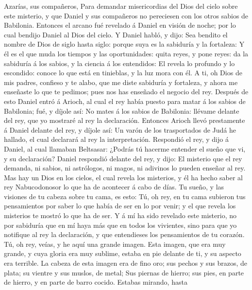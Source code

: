 Azarías, sus compañeros,  Para demandar misericordias del
Dios del cielo sobre este misterio, y que Daniel y sus compañeros no
pereciesen con los otros sabios de Babilonia.  Entonces el
arcano fué revelado á Daniel en visión de noche; por lo cual bendijo
Daniel al Dios del cielo.  Y Daniel habló, y dijo: Sea
bendito el nombre de Dios de siglo hasta siglo: porque suya es la
sabiduría y la fortaleza:  Y él es el que muda los tiempos
y las oportunidades: quita reyes, y pone reyes: da la sabiduría á los
sabios, y la ciencia á los entendidos:  El revela lo
profundo y lo escondido: conoce lo que está en tinieblas, y la luz mora
con él.  A ti, oh Dios de mis padres, confieso y te alabo,
que me diste sabiduría y fortaleza, y ahora me enseñaste lo que te
pedimos; pues nos has enseñado el negocio del rey.  Después
de esto Daniel entró á Arioch, al cual el rey había puesto para matar á
los sabios de Babilonia; fué, y díjole así: No mates á los sabios de
Babilonia: llévame delante del rey, que yo mostraré al rey la
declaración.  Entonces Arioch llevó prestamente á Daniel
delante del rey, y díjole así: Un varón de los trasportados de Judá he
hallado, el cual declarará al rey la interpretación. 
Respondió el rey, y dijo á Daniel, al cual llamaban Beltsasar: ¿Podrás
tú hacerme entender el sueño que vi, y su declaración? 
Daniel respondió delante del rey, y dijo: El misterio que el rey
demanda, ni sabios, ni astrólogos, ni magos, ni adivinos lo pueden
enseñar al rey.  Mas hay un Dios en los cielos, el cual
revela los misterios, y él ha hecho saber al rey Nabucodonosor lo que ha
de acontecer á cabo de días. Tu sueño, y las visiones de tu cabeza sobre
tu cama, es esto:  Tú, oh rey, en tu cama subieron tus
pensamientos por saber lo que había de ser en lo por venir; y el que
revela los misterios te mostró lo que ha de ser.  Y á mí ha
sido revelado este misterio, no por sabiduría que en mí haya más que en
todos los vivientes, sino para que yo notifique al rey la declaración, y
que entendieses los pensamientos de tu corazón.  Tú, oh
rey, veías, y he aquí una grande imagen. Esta imagen, que era muy
grande, y cuya gloria era muy sublime, estaba en pie delante de ti, y su
aspecto era terrible.  La cabeza de esta imagen era de fino
oro; sus pechos y sus brazos, de plata; su vientre y sus muslos, de
metal;  Sus piernas de hierro; sus pies, en parte de
hierro, y en parte de barro cocido.  Estabas mirando, hasta
